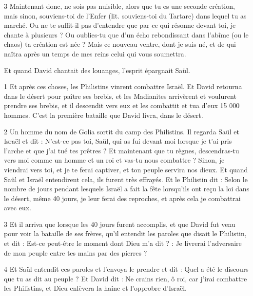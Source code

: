 \par 3 Maintenant donc, ne sois pas nuisible, alors que tu es une seconde création, mais sinon, souviens-toi de l'Enfer (lit. souviens-toi du Tartare) dans lequel tu as marché. Ou ne te suffit-il pas d'entendre que par ce qui résonne devant toi, je chante à plusieurs ? Ou oublies-tu que d'un écho rebondissant dans l'abîme (ou le chaos) ta création est née ? Mais ce nouveau ventre, dont je suis né, et de qui naîtra après un temps de mes reins celui qui vous soumettra.

\par Et quand David chantait des louanges, l'esprit épargnait Saül.


\par 1 Et après ces choses, les Philistins vinrent combattre Israël. Et David retourna dans le désert pour paître ses brebis, et les Madianites arrivèrent et voulurent prendre ses brebis, et il descendit vers eux et les combattit et tua d'eux 15 000 hommes. C'est la première bataille que David livra, dans le désert.

\par 2 Un homme du nom de Golia sortit du camp des Philistins. Il regarda Saül et Israël et dit : N'est-ce pas toi, Saül, qui as fui devant moi lorsque je t'ai pris l'arche et que j'ai tué tes prêtres ? Et maintenant que tu règnes, descendras-tu vers moi comme un homme et un roi et vas-tu nous combattre ? Sinon, je viendrai vers toi, et je te ferai captiver, et ton peuple servira nos dieux. Et quand Saül et Israël entendirent cela, ils furent très effrayés. Et le Philistin dit : Selon le nombre de jours pendant lesquels Israël a fait la fête lorsqu'ils ont reçu la loi dans le désert, même 40 jours, je leur ferai des reproches, et après cela je combattrai avec eux.

\par 3 Et il arriva que lorsque les 40 jours furent accomplis, et que David fut venu pour voir la bataille de ses frères, qu'il entendit les paroles que disait le Philistin, et dit : Est-ce peut-être le moment dont Dieu m'a dit ? : Je livrerai l'adversaire de mon peuple entre tes mains par des pierres ?

\par 4 Et Saül entendit ces paroles et l'envoya le prendre et dit : Quel a été le discours que tu as dit au peuple ? Et David dit : Ne crains rien, ô roi, car j'irai combattre les Philistins, et Dieu enlèvera la haine et l'opprobre d'Israël.

